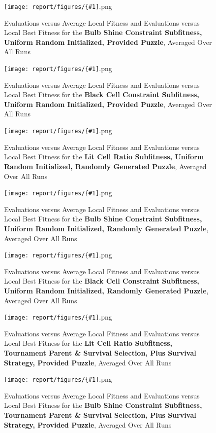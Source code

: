 \documentclass[11pt]{article}
\newcommand{\fitnessplotcaption}[1]{\caption{Evaluations versus Average Local Fitness and Evaluations versus 
    Local Best Fitness for the \textbf{{#1}}, Averaged Over All Runs}}
\newcommand{\addgraphic}[1]{\centerline{\texttt{[image: report/figures/\{\#1]}.png}}}
\begin{document}
\begin{figure}
    \addgraphic{website_puzzle_uniform_random_init_bulb_shine_constr__graph}
    \fitnessplotcaption{Bulb Shine Constraint Subfitness, Uniform Random Initialized, Provided Puzzle}
    \label{fig:website_u_shine}
\end{figure}

\begin{figure}
    \addgraphic{website_puzzle_uniform_random_init_black_cell_constr__graph}
    \fitnessplotcaption{Black Cell Constraint Subfitness, Uniform Random Initialized, Provided Puzzle}
    \label{fig:website_u_black}
\end{figure}

\begin{figure}
    \addgraphic{random_gen_uniform_random_init_lit_cell_ratio__graph}
    \fitnessplotcaption{Lit Cell Ratio Subfitness, Uniform Random Initialized, Randomly Generated Puzzle}
    \label{fig:random_gen_u_ratio}
\end{figure}

\begin{figure}
    \addgraphic{random_gen_uniform_random_init_bulb_shine_constr__graph}
    \fitnessplotcaption{Bulb Shine Constraint Subfitness, Uniform Random Initialized, Randomly Generated Puzzle}
    \label{fig:random_gen_u_shine}
\end{figure}

\begin{figure}
    \addgraphic{random_gen_uniform_random_init_black_cell_constr__graph}
    \fitnessplotcaption{Black Cell Constraint Subfitness, Uniform Random Initialized, Randomly Generated Puzzle}
    \label{fig:random_gen_u_black}
\end{figure}



\begin{figure}
    \addgraphic{website_puzzle__tournament_parent__tournament_survival__plus__lit_cell_ratio__graph}
    \fitnessplotcaption{Lit Cell Ratio Subfitness, Tournament Parent \& Survival Selection, Plus
    Survival Strategy, Provided Puzzle}
    \label{fig:tourny_web1}
\end{figure}

\begin{figure}
    \addgraphic{website_puzzle__tournament_parent__tournament_survival__plus__bulb_shine_constr__graph}
    \fitnessplotcaption{Bulb Shine Constraint Subfitness, Tournament Parent \& Survival Selection,
    Plus Survival Strategy, Provided Puzzle}
    \label{fig:tourny_web2}
\end{figure}
\end{document}
